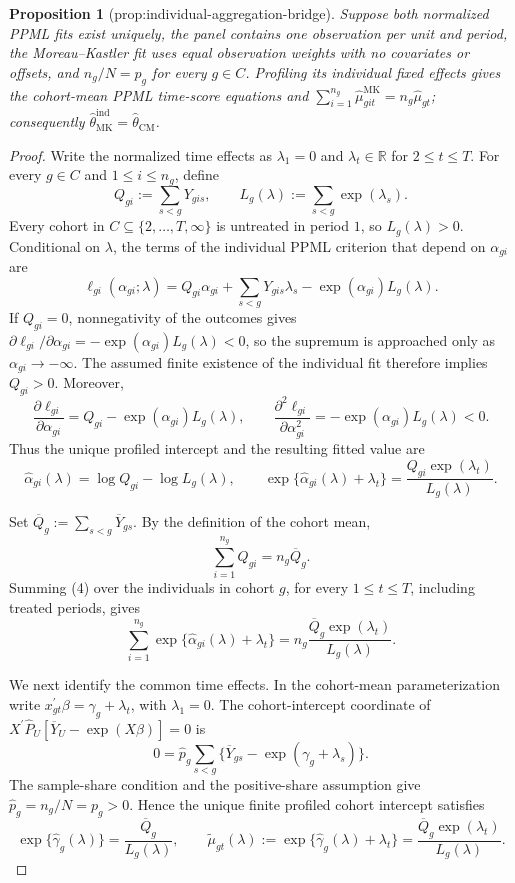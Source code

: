 \documentclass{article}
\newtheorem{proposition}{Proposition}
\begin{document}
\begin{proposition}[prop:individual-aggregation-bridge]\label{prop:individual-aggregation-bridge}
Suppose both normalized PPML fits exist uniquely, the panel contains one observation per unit and period, the Moreau--Kastler fit uses equal observation weights with no covariates or offsets, and \(n_g/N=p_g\) for every \(g\in C\). Profiling its individual fixed effects gives the cohort-mean PPML time-score equations and \(\sum_{i=1}^{n_g}\widehat\mu^{\mathrm{MK}}_{git}=n_g\widehat\mu_{gt}\); consequently \(\widehat\theta_{\mathrm{MK}}^{\mathrm{ind}}=\widehat\theta_{\mathrm{CM}}\).
\end{proposition}
\begin{proof}
Write the normalized time effects as \(\lambda _1=0\) and \(\lambda_t\in\mathbb R\) for \(2\le t\le T\).  For every \(g\in C\) and \(1\le i\le n_g\), define
\[
Q_{gi}:=\sum_{s<g}Y_{gis},
\qquad
L_g(\lambda):=\sum_{s<g}\exp(\lambda_s).
\tag{1}
\]
Every cohort in \(C\subseteq\{2,\ldots,T,\infty\}\) is untreated in period \(1\), so \(L_g(\lambda)>0\).  Conditional on \(\lambda\), the terms of the individual PPML criterion that depend on \(\alpha_{gi}\) are
\[
\ell_{gi}(\alpha_{gi};\lambda)
=Q_{gi}\alpha_{gi}
+\sum_{s<g}Y_{gis}\lambda_s
-\exp(\alpha_{gi})L_g(\lambda).
\tag{2}
\]
If \(Q_{gi}=0\), nonnegativity of the outcomes gives
\(\partial\ell_{gi}/\partial\alpha_{gi}=-\exp(\alpha_{gi})L_g(\lambda)<0\), so the supremum is approached only as \(\alpha_{gi}\to-\infty\).  The assumed finite existence of the individual fit therefore implies \(Q_{gi}>0\).  Moreover,
\[
\frac{\partial\ell_{gi}}{\partial\alpha_{gi}}
=Q_{gi}-\exp(\alpha_{gi})L_g(\lambda),
\qquad
\frac{\partial^2\ell_{gi}}{\partial\alpha_{gi}^2}
=-\exp(\alpha_{gi})L_g(\lambda)<0.
\tag{3}
\]
Thus the unique profiled intercept and the resulting fitted value are
\[
\widehat\alpha_{gi}(\lambda)
=\log Q_{gi}-\log L_g(\lambda),
\qquad
\exp\{\widehat\alpha_{gi}(\lambda)+\lambda_t\}
=\frac{Q_{gi}\exp(\lambda_t)}{L_g(\lambda)}.
\tag{4}
\]

Set \(\overline Q_g:=\sum_{s<g}\overline Y_{gs}\).  By the definition of the cohort mean,
\[
\sum_{i=1}^{n_g}Q_{gi}=n_g\overline Q_g.
\tag{5}
\]
Summing (4) over the individuals in cohort \(g\), for every \(1\le t\le T\), including treated periods, gives
\[
\sum_{i=1}^{n_g}
\exp\{\widehat\alpha_{gi}(\lambda)+\lambda_t\}
=n_g\frac{\overline Q_g\exp(\lambda_t)}{L_g(\lambda)}.
\tag{6}
\]

We next identify the common time effects.  In the cohort-mean parameterization write \(x_{gt}^{\prime}\beta=\gamma_g+\lambda_t\), with \(\lambda_1=0\).  The cohort-intercept coordinate of
\(X^{\prime}\widehat P_U[\overline Y_U-\exp(X\beta)]=0\) is
\[
0=\widehat p_g\sum_{s<g}
\{\overline Y_{gs}-\exp(\gamma_g+\lambda_s)\}.
\tag{7}
\]
The sample-share condition and the positive-share assumption give
\(\widehat p_g=n_g/N=p_g>0\).  Hence the unique finite profiled cohort intercept satisfies
\[
\exp\{\widehat\gamma_g(\lambda)\}
=\frac{\overline Q_g}{L_g(\lambda)},
\qquad
\widetilde\mu_{gt}(\lambda)
:=\exp\{\widehat\gamma_g(\lambda)+\lambda_t\}
=\frac{\overline Q_g\exp(\lambda_t)}{L_g(\lambda)}.
\tag{8}
\]


\end{proof}
\end{document}
